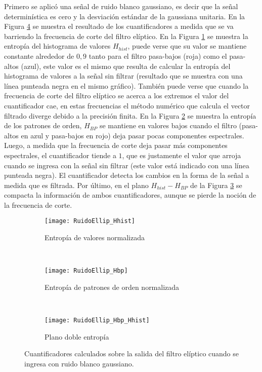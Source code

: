 Primero se aplicó una señal de ruido blanco gaussiano, es decir que la señal determinística es cero y la desviación estándar de la gaussiana unitaria.
En la Figura \ref{fig:ellip} se muestra el resultado de los cuantificadores a medida que se va barriendo la frecuencia de corte del filtro elíptico.
En la Figura \ref{subfig:ellip_Hhist} se muestra la entropía del histograma de valores $H_{hist}$, puede verse que su valor se mantiene constante alrededor de $0,9$ tanto para el filtro pasa-bajos (roja) como el pasa-altos (azul), este valor es el mismo que resulta de calcular la entropía del histograma de valores a la señal sin filtrar (resultado que se muestra con una línea punteada negra en el mismo gráfico). También puede verse que cuando la frecuencia de corte del filtro elíptico se acerca a los extremos el valor del cuantificador cae, en estas frecuencias el método numérico que calcula el vector filtrado diverge debido a la precisión finita.
En la Figura \ref{subfig:ellip_Hbp} se muestra la entropía de los patrones de orden, $H_{BP}$ se mantiene en valores bajos cuando el filtro (pasa-altos en azul y pasa-bajos en rojo) deja pasar pocas componentes espectrales. Luego, a medida que la frecuencia de corte deja pasar más componentes espectrales, el cuantificador tiende a $1$, que es justamente el valor que arroja cuando se ingresa con la señal sin filtrar (este valor está indicado con una línea punteada negra).
El cuantificador detecta los cambios en la forma de la señal a medida que es filtrada.
Por último, en el plano $H_{hist} - H_{BP}$ de la Figura \ref{subfig:ellip_HbpHhist} se compacta la información de ambos cuantificadores, aunque se pierde la noción de la frecuencia de corte.
%
\begin{figure}[h]
    \centering
    \begin{subfigure}[t]{.49\textwidth}
        \texttt{[image: RuidoEllip\_Hhist]}
        \caption{Entropía de valores normalizada}
        \label{subfig:ellip_Hhist}
    \end{subfigure}
    ~ %
    \begin{subfigure}[t]{.49\textwidth}
        \texttt{[image: RuidoEllip\_Hbp]}
        \caption{Entropía de patrones de orden normalizada}
        \label{subfig:ellip_Hbp}
    \end{subfigure}
    ~ %
    \begin{subfigure}[t]{.49\textwidth}
        \texttt{[image: RuidoEllip\_Hbp\_Hhist]}
        \caption{Plano doble entropía}
        \label{subfig:ellip_HbpHhist}
    \end{subfigure}
    \caption{Cuantificadores calculados sobre la salida del filtro elíptico cuando se ingresa con ruido blanco gaussiano.}\label{fig:ellip}
\end{figure}

